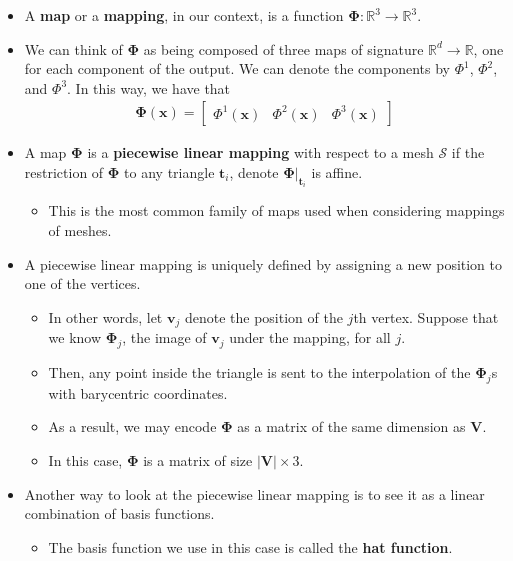 \documentclass[10pt]{article}
\newcommand{\ve}[1]{\mathbf{#1}}
\newcommand{\ves}[1]{\boldsymbol{#1}}
\newcommand{\ra}{\rightarrow}
\newcommand{\mcal}[1]{\mathcal{#1}}
\newcommand{\Real}{\mathbb{R}}
\begin{document}
\begin{itemize}    
    \item A {\bf map} or a {\bf mapping}, in our context, is a function $\ves{\Phi}: \Real^{3} \ra \Real^{3}$.
    
    \item We can think of $\ves{\Phi}$ as being composed of three maps of signature $\Real^d \ra \Real$, one for each component of the output. We can denote the components by $\Phi^1$, $\Phi^2$, and $\Phi^3$. In this way, we have that
    \begin{align*}
        \ves{\Phi}(\ve{x}) = \begin{bmatrix} \Phi^1(\ve{x}) & \Phi^2(\ve{x}) & \Phi^3(\ve{x}) \end{bmatrix}
    \end{align*}
    
    \item A map $\ves{\Phi}$ is a {\bf piecewise linear mapping} with respect to a mesh $\mcal{S}$ if the restriction of $\ves{\Phi}$ to any triangle $\ve{t}_i$, denote $\ves{\Phi}|_{\ve{t}_i}$ is affine.
    \begin{itemize}
        \item This is the most common family of maps used when considering mappings of meshes.        
    \end{itemize}

    \item A piecewise linear mapping is uniquely defined by assigning a new position to one of the vertices.
    \begin{itemize}
        \item In other words, let $\ve{v}_j$ denote the position of the $j$th vertex. Suppose that we know $\ves{\Phi}_j$, the image of $\ve{v}_j$ under the mapping, for all $j$.
        
        \item Then, any point inside the triangle is sent to the interpolation of the $\ves{\Phi}_j$s with barycentric coordinates.            
        
        \item As a result, we may encode $\ves{\Phi}$ as a matrix of the same dimension as $\ve{V}$.
        
        \item In this case, $\ves{\Phi}$ is a matrix of size $|\ve{V}| \times 3$.
    \end{itemize}

    \item Another way to look at the piecewise linear mapping is to see it as a linear combination of basis functions.
    \begin{itemize}
        \item The basis function we use in this case is called the {\bf hat function}.
        

\end{itemize}
\end{itemize}
\end{document}
